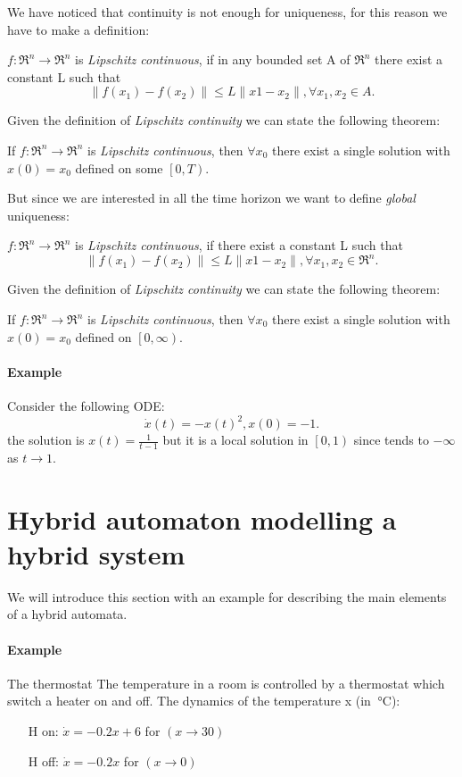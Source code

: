 We have noticed that continuity is not enough for uniqueness, for this reason we have to make a definition:

\begin{defn} 
	$f\colon\Re^n\to\Re^n$ is \emph{Lipschitz continuous}, if in any bounded set A of $\Re^n$ there exist a constant L such that
	\[
	\|f(x_1)-f(x_2)\| \le L \|x1-x_2\|, \forall x_1,x_2 \in A.
	\]
\end{defn}

Given the definition of \emph{Lipschitz continuity} we can state the following theorem:

\begin{thm}
	If $f\colon\Re^n\to\Re^n$ is \emph{Lipschitz continuous}, then $\forall x_0$ there exist a single solution with $x(0)=x_0$ defined on some $ \left[0,T\right)$.
\end{thm}
But since we are interested in all the time horizon we want to define \emph{global} uniqueness:
\begin{defn} 
	$f\colon\Re^n\to\Re^n$ is \emph{Lipschitz continuous}, if there exist a constant L such that
	\[
	\|f(x_1)-f(x_2)\| \le L \|x1-x_2\|, \forall x_1,x_2 \in \Re^n.
	\]
\end{defn}

Given the definition of \emph{Lipschitz continuity} we can state the following theorem:

\begin{thm}
	If $f\colon\Re^n\to\Re^n$ is \emph{Lipschitz continuous}, then $\forall x_0$ there exist a single solution with $x(0)=x_0$ defined on $ \left[0,\infty\right)$.
\end{thm}
\paragraph{Example}
Consider the following ODE: 
\[
\dot{x}(t)=-x(t)^2, x(0)=-1.
\]
the solution is $x(t)=\frac{1}{t-1}$ but it is a local solution in $\left[0,1\right)$ since tends to $-\infty$ as $t\to 1$.
\section{Hybrid automaton modelling a hybrid system}
We will introduce this section with an example for describing the main elements of a hybrid automata.
\paragraph{Example} The thermostat
The temperature in a room is controlled by a thermostat which switch a heater on and off.
The dynamics of the temperature x (in $\SI{}{\celsius}$):
	\begin{itemize}
		\item[H on:] $\dot{x} = -0.2x+6 $ for $(x\to30)$
		\item[H off:]$\dot{x}= -0.2x $  for $ (x\to 0)$
	\end{itemize} 



